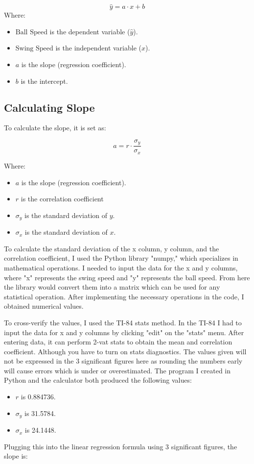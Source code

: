 \documentclass[12pt]{article}
\begin{document}
\[
\hat{y} = a \cdot x + b
\]
\hspace{1em}Where:
\begin{itemize}
  \item \(\text{Ball Speed}\) is the dependent variable (\(\hat{y}\)).
  \item \(\text{Swing Speed}\) is the independent variable (\(x\)).
  \item \(a\) is the slope (regression coefficient).
  \item \(b\) is the intercept.
\end{itemize}
\subsection*{Calculating Slope}

\hspace{1em}To calculate the slope, it is set as:

\[
a = r \cdot \frac{\displaystyle\sigma_y}{\displaystyle\sigma_x}
\]

Where:
\begin{itemize}
  \item \(a\) is the slope (regression coefficient).
  \item \(r\) is the correlation coefficient
  \item \(\displaystyle\sigma_y\) is the standard deviation of \(y\).
  \item \(\displaystyle\sigma_x\) is the standard deviation of \(x\).
\end{itemize}

To calculate the standard deviation of the x column, y column, and the correlation coefficient, I used the Python library "numpy," which specializes in mathematical operations. I needed to input the data for the x and y columns, where "x" represents the swing speed and "y" represents the ball speed. From here the library would convert them into a matrix which can be used for any statistical operation. After implementing the necessary operations in the code, I obtained numerical values.

To cross-verify the values, I used the TI-84 stats method. In the TI-84 I had to input the data for x and y columns by clicking "edit" on the "stats" menu. After entering data, it can perform 2-vat stats to obtain the mean and correlation coefficient. Although you have to turn on stats diagnostics. The values given will not be expressed in the 3 significant figures here as rounding the numbers early will cause errors which is under or overestimated. The program I created in Python and the calculator both produced the following values:
\begin{itemize}
  \item \(r\) is 0.884736.
  \item \(\displaystyle\sigma_y\) is 31.5784.
  \item \(\displaystyle\sigma_x\) is 24.1448.
\end{itemize}
Plugging this into the linear regression formula using 3 significant figures, the slope is:
\end{document}
